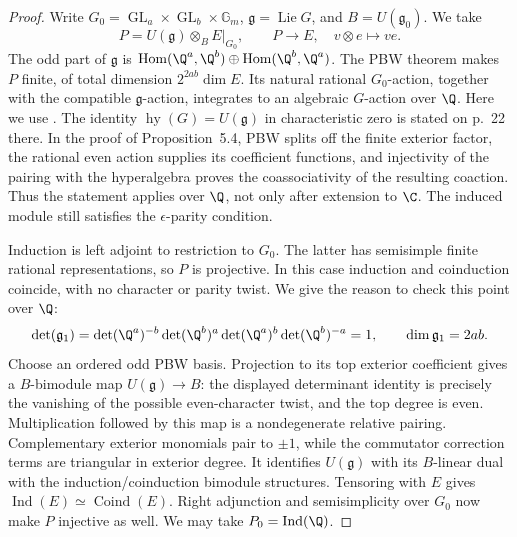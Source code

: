 \begin{proof}
Write $G_0=\operatorname{GL}_a\times\operatorname{GL}_b\times
\mathbb G_m$, $\mathfrak g=\operatorname{Lie}G$, and
$B=U(\mathfrak g_0)$.  We take
\[
 P=U(\mathfrak g)\otimes_B E|_{G_0},\qquad
 P\longrightarrow E,\quad v\otimes e\longmapsto ve.
\]
The odd part of $\mathfrak g$ is
$\operatorname{Hom}(\Q^a,\Q^b)\oplus
\operatorname{Hom}(\Q^b,\Q^a)$.
The PBW theorem makes $P$ finite, of total dimension
$2^{2ab}\dim E$.  Its natural rational $G_0$-action, together with
the compatible $\mathfrak g$-action, integrates to an algebraic
$G$-action over $\Q$.  Here we use
\citet[Corollary~3.6, p.~9; Proposition~5.4 and its proof,
pp.~23--24; Theorem~5.8 and Corollary~5.10, p.~26]{c_masuokashibata2017super}.
The identity $\operatorname{hy}(G)=U(\mathfrak g)$ in characteristic
zero is stated on p.~22 there.  In the proof of Proposition~5.4,
PBW splits off the finite exterior factor, the rational even action
supplies its coefficient functions, and injectivity of the pairing
with the hyperalgebra proves the coassociativity of the resulting
coaction.  Thus the statement applies over $\Q$, not only after
extension to $\C$.  The induced module still satisfies the
$\epsilon$-parity condition.

Induction is left adjoint to restriction to $G_0$.  The latter has
semisimple finite rational representations, so $P$ is projective.
In this case induction and coinduction coincide, with no character
or parity twist.  We give the reason to check this point over $\Q$:
\[
 \det(\mathfrak g_1)
 =\det(\Q^a)^{-b}\det(\Q^b)^a
  \det(\Q^a)^b\det(\Q^b)^{-a}=1,
 \qquad \dim\mathfrak g_1=2ab.
\]
Choose an ordered odd PBW basis.  Projection to its top exterior
coefficient gives a $B$-bimodule map $U(\mathfrak g)\to B$:
the displayed determinant identity is precisely the vanishing of
the possible even-character twist, and the top degree is even.
Multiplication followed by this map is a nondegenerate relative
pairing.  Complementary exterior monomials pair to $\pm1$, while
the commutator correction terms are triangular in exterior degree.
It identifies $U(\mathfrak g)$ with its $B$-linear dual with the
induction/coinduction bimodule structures.  Tensoring with $E$
gives $\operatorname{Ind}(E)\simeq\operatorname{Coind}(E)$.
Right adjunction and semisimplicity over $G_0$ now make $P$
injective as well.  We may take $P_0=\operatorname{Ind}(\Q)$.


\end{proof}
